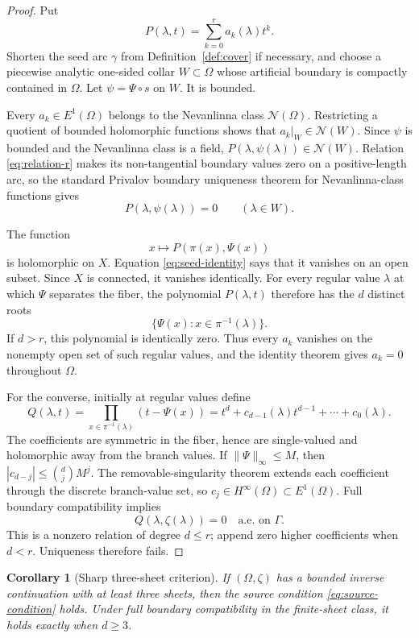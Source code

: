 \documentclass[11pt]{article}
\newtheorem{corollary}[theorem]{Corollary}
\begin{document}
\begin{proof}
Put
\[
 P(\lambda,t)=\sum_{k=0}^{r}a_k(\lambda)t^k.
\]
Shorten the seed arc $\gamma$ from Definition~\ref{def:cover} if necessary,
and choose a piecewise analytic one-sided collar $W\subset\Omega$ whose
artificial boundary is compactly contained in $\Omega$.  Let
$\psi=\Psi\circ s$ on $W$.  It is bounded.

Every $a_k\in E^1(\Omega)$ belongs to the Nevanlinna class
$\mathcal N(\Omega)$.  Restricting a quotient of bounded holomorphic
functions shows that $a_k|_W\in\mathcal N(W)$.  Since $\psi$ is bounded and
the Nevanlinna class is a field,
$P(\lambda,\psi(\lambda))\in\mathcal N(W)$.  Relation
\eqref{eq:relation-r} makes its non-tangential boundary values zero on a
positive-length arc, so the standard Privalov boundary uniqueness theorem
for Nevanlinna-class functions gives
\begin{equation}\label{eq:seed-identity}
 P(\lambda,\psi(\lambda))=0\qquad(\lambda\in W).
\end{equation}

The function
\[
 x\longmapsto P(\pi(x),\Psi(x))
\]
is holomorphic on $X$.  Equation \eqref{eq:seed-identity} says that it
vanishes on an open subset.  Since $X$ is connected, it vanishes identically.
For every regular value $\lambda$ at which $\Psi$ separates the fiber, the
polynomial $P(\lambda,t)$ therefore has the $d$ distinct roots
\[
 \{\Psi(x):x\in\pi^{-1}(\lambda)\}.
\]
If $d>r$, this polynomial is identically zero.  Thus every $a_k$ vanishes on
the nonempty open set of such regular values, and the identity theorem gives
$a_k=0$ throughout $\Omega$.

For the converse, initially at regular values define
\[
 Q(\lambda,t)=\prod_{x\in\pi^{-1}(\lambda)}(t-\Psi(x))
 =t^d+c_{d-1}(\lambda)t^{d-1}+\cdots+c_0(\lambda).
\]
The coefficients are symmetric in the fiber, hence are single-valued and
holomorphic away from the branch values.  If $\|\Psi\|_\infty\le M$, then
$|c_{d-j}|\le \binom{d}{j}M^j$.  The removable-singularity theorem extends
each coefficient through the discrete branch-value set, so
$c_j\in H^\infty(\Omega)\subset E^1(\Omega)$.  Full boundary compatibility
implies
\[
 Q(\lambda,\zeta(\lambda))=0\quad\text{a.e. on }\Gamma.
\]
This is a nonzero relation of degree $d\le r$; append zero higher
coefficients when $d<r$.  Uniqueness therefore fails.
\end{proof}

\begin{corollary}[Sharp three-sheet criterion]\label{cor:quadratic}
If $(\Omega,\zeta)$ has a bounded inverse continuation with at least three
sheets, then the source condition \eqref{eq:source-condition} holds.  Under
full boundary compatibility in the finite-sheet class, it holds exactly when
$d\ge3$.
\end{corollary}
\end{document}
